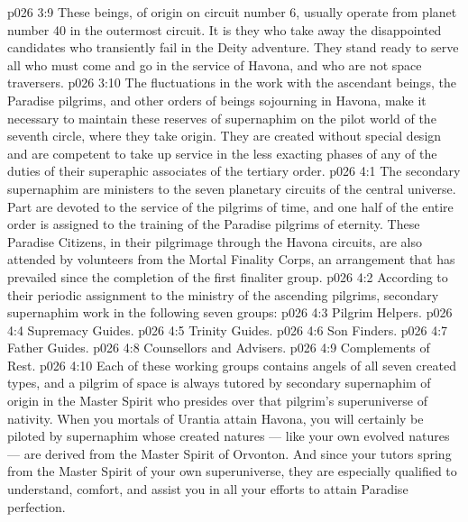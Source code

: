 \vs p026 3:9 \bibnobreakspace {} These beings, of origin on circuit number 6, usually operate from planet number 40 in the outermost circuit. It is they who take away the disappointed candidates who transiently fail in the Deity adventure. They stand ready to serve all who must come and go in the service of Havona, and who are not space traversers.
\vs p026 3:10 \bibnobreakspace {} The fluctuations in the work with the ascendant beings, the Paradise pilgrims, and other orders of beings sojourning in Havona, make it necessary to maintain these reserves of supernaphim on the pilot world of the seventh circle, where they take origin. They are created without special design and are competent to take up service in the less exacting phases of any of the duties of their superaphic associates of the tertiary order.
\vs p026 4:1 The secondary supernaphim are ministers to the seven planetary circuits of the central universe. Part are devoted to the service of the pilgrims of time, and one half of the entire order is assigned to the training of the Paradise pilgrims of eternity. These Paradise Citizens, in their pilgrimage through the Havona circuits, are also attended by volunteers from the Mortal Finality Corps, an arrangement that has prevailed since the completion of the first finaliter group.
\vs p026 4:2 \pc According to their periodic assignment to the ministry of the ascending pilgrims, secondary supernaphim work in the following seven groups:
\vs p026 4:3 \bibnobreakspace Pilgrim Helpers.
\vs p026 4:4 \bibnobreakspace Supremacy Guides.
\vs p026 4:5 \bibnobreakspace Trinity Guides.
\vs p026 4:6 \bibnobreakspace Son Finders.
\vs p026 4:7 \bibnobreakspace Father Guides.
\vs p026 4:8 \bibnobreakspace Counsellors and Advisers.
\vs p026 4:9 \bibnobreakspace Complements of Rest.
\vs p026 4:10 \pc Each of these working groups contains angels of all seven created types, and a pilgrim of space is always tutored by secondary supernaphim of origin in the Master Spirit who presides over that pilgrim’s superuniverse of nativity. When you mortals of Urantia attain Havona, you will certainly be piloted by supernaphim whose created natures --- like your own evolved natures --- are derived from the Master Spirit of Orvonton. And since your tutors spring from the Master Spirit of your own superuniverse, they are especially qualified to understand, comfort, and assist you in all your efforts to attain Paradise perfection.
